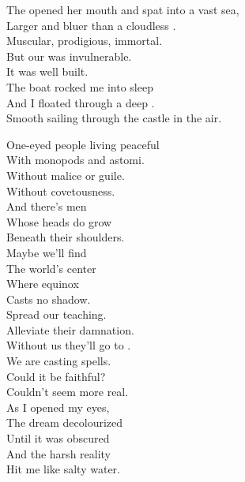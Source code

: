 



The  opened her mouth and spat into a vast sea, \\
Larger and bluer than a cloudless . \\
Muscular, prodigious, immortal. \\
But our  was invulnerable. \\
It was well built. \\
The boat rocked me into sleep \\
And I floated through a deep . \\
Smooth sailing through the castle in the air. \\


One-eyed people living peaceful \\
With monopods and astomi. \\
Without malice or guile. \\
Without covetousness. \\

And there's men \\
Whose heads do grow \\
Beneath their shoulders. \\
Maybe we'll find \\
The world's center \\
Where equinox \\
Casts no shadow. \\
Spread our teaching. \\
Alleviate their damnation. \\

Without us they'll go to . \\
We are casting spells. \\

Could it be faithful? \\
Couldn't seem more real. \\
As I opened my eyes, \\
The dream decolourized \\
Until it was obscured \\
And the harsh reality \\
Hit me like salty water. \\

